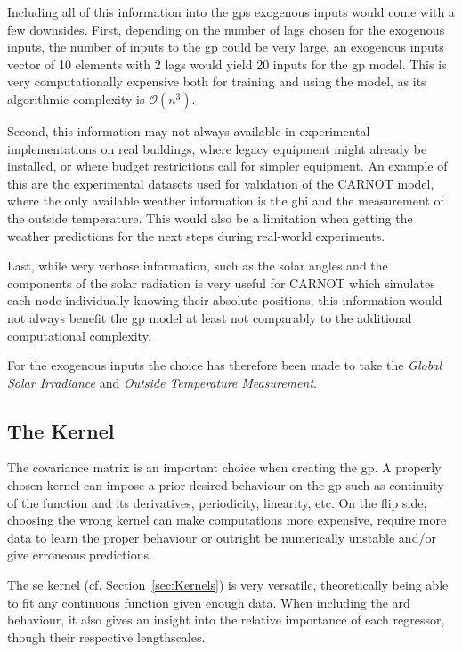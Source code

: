 Including all of this information into the \acrshort{gp}s exogenous inputs would
come with a few downsides. First, depending on the number of lags chosen for the
exogenous inputs, the number of inputs to the \acrshort{gp} could be very large,
an exogenous inputs vector of 10 elements with 2 lags would yield 20 inputs for
the \acrshort{gp} model. This is very computationally expensive both for
training and using the model, as its algorithmic complexity is
$\mathcal{O}(n^3)$.

Second, this information may not always available in experimental
implementations on real buildings, where legacy equipment might already be
installed, or where budget restrictions call for simpler equipment.  An example
of this are the experimental datasets used for validation of the CARNOT model,
where the only available weather information is the \acrshort{ghi} and the
measurement of the outside temperature. This would also be a limitation when
getting the weather predictions for the next steps during real-world
experiments.

Last, while very verbose information, such as the solar angles and the components
of the solar radiation is very useful for CARNOT which simulates each node
individually knowing their absolute positions, this information would not
always benefit the \acrshort{gp} model at least not comparably to the
additional computational complexity.

For the exogenous inputs the choice has therefore been made to take the
\textit{Global Solar Irradiance} and \textit{Outside Temperature Measurement}.

\subsection{The Kernel}

The covariance matrix is an important choice when creating the \acrshort{gp}. A
properly chosen kernel can impose a prior desired behaviour on the
\acrshort{gp} such as continuity of the function and its derivatives,
periodicity, linearity, etc. On the flip side, choosing the wrong kernel can
make computations more expensive, require more data to learn the proper
behaviour or outright be numerically unstable and/or give erroneous predictions.

The \acrlong{se} kernel (cf. Section~\ref{sec:Kernels}) is very versatile,
theoretically being able to fit any continuous function given enough data. When
including the \acrshort{ard} behaviour, it also gives an insight into the
relative importance of each regressor, though their respective lengthscales.

